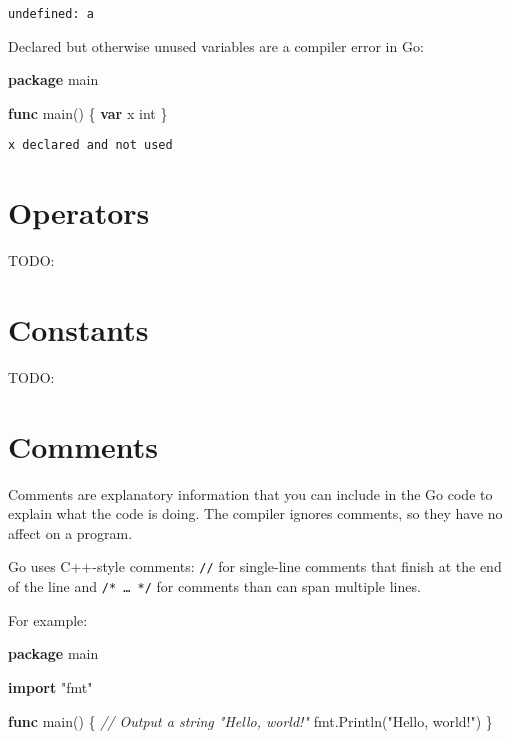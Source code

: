 \documentclass[]{book}
\newenvironment{Shaded}{\begin{snugshade}}{\end{snugshade}}
\newcommand{\CommentTok}[1]{\textcolor[rgb]{0.56,0.35,0.01}{\textit{#1}}}
\newcommand{\DataTypeTok}[1]{\textcolor[rgb]{0.13,0.29,0.53}{#1}}
\newcommand{\KeywordTok}[1]{\textcolor[rgb]{0.13,0.29,0.53}{\textbf{#1}}}
\newcommand{\NormalTok}[1]{#1}
\newcommand{\StringTok}[1]{\textcolor[rgb]{0.31,0.60,0.02}{#1}}
\begin{document}
\begin{verbatim}
undefined: a
\end{verbatim}

Declared but otherwise unused variables are a compiler error in Go:

\begin{Shaded}
\begin{Highlighting}[]
\KeywordTok{package}\NormalTok{ main}

\KeywordTok{func}\NormalTok{ main() \{}
    \KeywordTok{var}\NormalTok{ x }\DataTypeTok{int}
\NormalTok{\}}
\end{Highlighting}
\end{Shaded}

\begin{verbatim}
x declared and not used
\end{verbatim}

\hypertarget{operators}{%
\section{Operators}\label{operators}}

TODO:

\hypertarget{constants}{%
\section{Constants}\label{constants}}

TODO:

\hypertarget{comments}{%
\section{Comments}\label{comments}}

Comments are explanatory information that you can include in the Go code to
explain what the code is doing. The compiler ignores comments, so they have no
affect on a program.

Go uses C++-style comments: \texttt{//} for single-line comments that finish at the
end of the line and \texttt{/*~\ldots{}~*/} for comments than can span multiple lines.

For example:

\begin{Shaded}
\begin{Highlighting}[]
\KeywordTok{package}\NormalTok{ main}

\KeywordTok{import} \StringTok{"fmt"}

\KeywordTok{func}\NormalTok{ main() \{}
    \CommentTok{// Output a string "Hello, world!"}
\NormalTok{    fmt.Println(}\StringTok{"Hello, world!"}\NormalTok{)}
\NormalTok{\}}
\end{Highlighting}
\end{Shaded}
\end{document}
